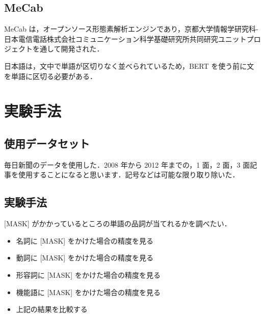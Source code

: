 \documentclass[twocolumn]{jarticle}
\begin{document}
  \subsection{MeCab}
  MeCab は，オープンソース形態素解析エンジンであり，京都大学情報学研究科-日本電信電話株式会社コミュニケーション科学基礎研究所共同研究ユニットプロジェクトを通して開発された．
  \par
  日本語は，文中で単語が区切りなく並べられているため，BERT を使う前に文を単語に区切る必要がある．
  \par

\section{実験手法}
\subsection{使用データセット}
毎日新聞のデータを使用した．2008 年から 2012 年までの，1 面，2 面，3 面記事を使用することになると思います．記号などは可能な限り取り除いた．


\subsection{実験手法}

[MASK] がかかっているところの単語の品詞が当てれるかを調べたい．
\begin{itemize}
  \item 名詞に [MASK] をかけた場合の精度を見る
  \item 動詞に [MASK] をかけた場合の精度を見る
  \item 形容詞に [MASK] をかけた場合の精度を見る
  \item 機能語に [MASK] をかけた場合の精度を見る
  \item 上記の結果を比較する
\end{itemize}
\end{document}
